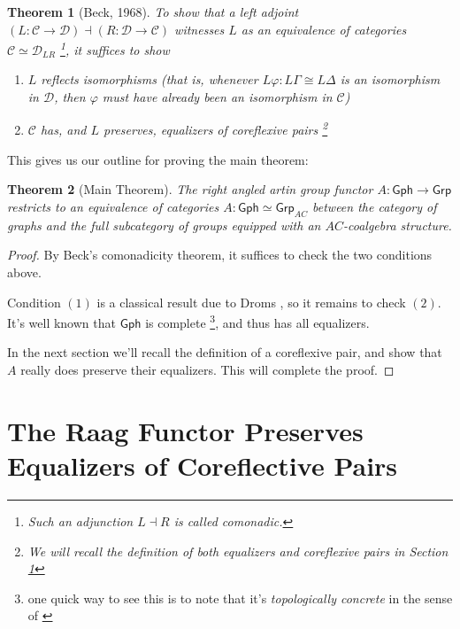 \documentclass[microtype]{gtpart}
\newtheorem*{thm*}{Theorem}
\theoremstyle{definition}
\theoremstyle{theorem}
\newcommand*{\catFont}[1]{\mathsf{#1}}
\newcommand*{\catVarFont}[1]{\mathcal{#1}}
\newcommand{\Grp}{\catFont{Grp}}
\newcommand{\catC}{\catVarFont{C}}
\newcommand{\catD}{\catVarFont{D}}
\newcommand{\Gph}{\mathsf{Gph}}
\begin{document}
\begin{thm*}[Beck, 1968]
  To show that a left adjoint
  $(L : \catC \to \catD) \dashv (R : \catD \to \catC)$ 
  witnesses $L$ as an equivalence of categories $\catC \simeq \catD_{LR}$%
  \footnote{Such an adjunction $L \dashv R$ is called \emph{comonadic}.},
  it suffices to show

  \begin{enumerate}
      \item $L$ reflects isomorphisms (that is, whenever 
        $L \varphi : L\Gamma \cong L\Delta$ is an isomorphism in $\catD$, 
        then $\varphi$ must have already been an isomorphism in $\catC$)
      \item $\catC$ has, and $L$ preserves, equalizers of coreflexive pairs%
        \footnote{We will recall the definition of both equalizers and 
        coreflexive pairs in Section \ref{proof}}
  \end{enumerate}
\end{thm*}

This gives us our outline for proving the main theorem:

\begin{thm*}[Main Theorem]
  The right angled artin group functor $A : \Gph \to \Grp$ restricts to 
  an equivalence of categories $A : \Gph \simeq \Grp_{AC}$ between the 
  category of graphs and the full subcategory of groups equipped with an 
  $AC$-coalgebra structure.
\end{thm*}

\begin{proof}
  By Beck's comonadicity theorem, it suffices to check the two conditions 
  above.

  Condition $(1)$ is a classical result due to Droms 
  \cite{dromsIsomorphismsGraphGroups1987}, 
  so it remains to check $(2)$. It's well known that $\mathsf{Gph}$
  is complete%
  \footnote{one quick way to see this is to note that it's \emph{topologically concrete}
  in the sense of \cite{adamekAbstractConcreteCategories2009}}, and thus has all equalizers. 

  In the next section we'll recall the definition of a coreflexive pair, 
  and show that $A$ really does preserve their equalizers. This will 
  complete the proof.
\end{proof}

\section{The Raag Functor Preserves Equalizers of Coreflective Pairs}
\label{proof}
\end{document}
